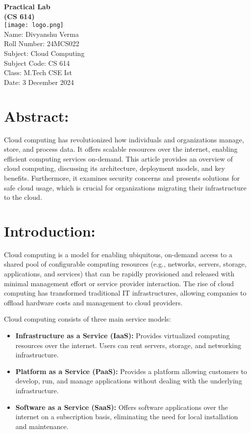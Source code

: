 \documentclass[14pt]{article}
\begin{document}
\begin{center}
{\LARGE
    \textbf{Practical Lab}\\
    \textbf{(CS 614)}\\
    \texttt{[image: logo.png]}\\
    Name: Divyanshu Verma\\ 
    Roll Number: 24MCS022 \\ 
    Subject: Cloud Computing \\ 
    Subject Code: CS 614 \\ 
    Class: M.Tech CSE Ist \\ 
    Date: 3 December 2024 \\ 
}
\end{center}

\newpage

\section{Abstract:}
Cloud computing has revolutionized how individuals and organizations manage, store, and process data. It offers scalable resources over the internet, enabling efficient computing services on-demand. This article provides an overview of cloud computing, discussing its architecture, deployment models, and key benefits. Furthermore, it examines security concerns and presents solutions for safe cloud usage, which is crucial for organizations migrating their infrastructure to the cloud.

\section{Introduction:}
Cloud computing is a model for enabling ubiquitous, on-demand access to a shared pool of configurable computing resources (e.g., networks, servers, storage, applications, and services) that can be rapidly provisioned and released with minimal management effort or service provider interaction. The rise of cloud computing has transformed traditional IT infrastructures, allowing companies to offload hardware costs and management to cloud providers.

Cloud computing consists of three main service models:

\begin{itemize}
    \item \textbf{Infrastructure as a Service (IaaS):} Provides virtualized computing resources over the internet. Users can rent servers, storage, and networking infrastructure.
    \item \textbf{Platform as a Service (PaaS):} Provides a platform allowing customers to develop, run, and manage applications without dealing with the underlying infrastructure.
    \item \textbf{Software as a Service (SaaS):} Offers software applications over the internet on a subscription basis, eliminating the need for local installation and maintenance.
\end{itemize}
\end{document}
